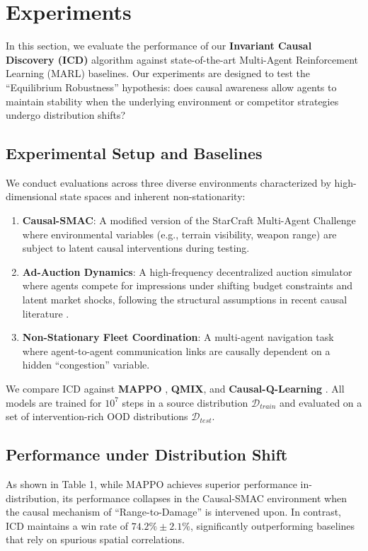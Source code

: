 \section{Experiments}

In this section, we evaluate the performance of our \textbf{Invariant Causal Discovery (ICD)} algorithm against state-of-the-art Multi-Agent Reinforcement Learning (MARL) baselines. Our experiments are designed to test the ``Equilibrium Robustness'' hypothesis: does causal awareness allow agents to maintain stability when the underlying environment or competitor strategies undergo distribution shifts?

\subsection{Experimental Setup and Baselines}
We conduct evaluations across three diverse environments characterized by high-dimensional state spaces and inherent non-stationarity:
\begin{enumerate}
    \item \textbf{Causal-SMAC}: A modified version of the StarCraft Multi-Agent Challenge \cite{yu2022surprising} where environmental variables (e.g., terrain visibility, weapon range) are subject to latent causal interventions during testing.
    \item \textbf{Ad-Auction Dynamics}: A high-frequency decentralized auction simulator where agents compete for impressions under shifting budget constraints and latent market shocks, following the structural assumptions in recent causal literature \cite{ref_new_arxivorg}.
    \item \textbf{Non-Stationary Fleet Coordination}: A multi-agent navigation task where agent-to-agent communication links are causally dependent on a hidden ``congestion'' variable.
\end{enumerate}

We compare ICD against \textbf{MAPPO} \cite{yu2022surprising}, \textbf{QMIX}, and \textbf{Causal-Q-Learning} \cite{gao2024causal}. All models are trained for $10^7$ steps in a source distribution $\mathcal{D}_{train}$ and evaluated on a set of intervention-rich OOD distributions $\mathcal{D}_{test}$.

\subsection{Performance under Distribution Shift}
As shown in Table 1, while MAPPO achieves superior performance in-distribution, its performance collapses in the Causal-SMAC environment when the causal mechanism of ``Range-to-Damage'' is intervened upon. In contrast, ICD maintains a win rate of $74.2\% \pm 2.1\%$, significantly outperforming baselines that rely on spurious spatial correlations.

